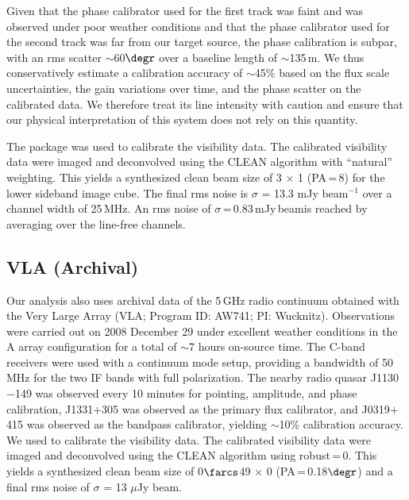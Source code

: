 \documentclass[]{emulateapj}
\begin{document}
%
%
Given that the phase calibrator used for the first track was faint and was
observed under poor weather conditions and that the phase calibrator used for
the second track was far from our target source, the phase calibration is
subpar, with an rms scatter $\sim$60$\degr$ over a baseline length of $\sim$135\,m.
We thus conservatively estimate
a calibration accuracy of $\sim$45\% based on the flux scale uncertainties,
the gain variations over time, and the phase scatter on the calibrated data. We
therefore treat its line intensity with caution and ensure that our physical interpretation
of this system does not rely on this quantity.

The  package was used to calibrate the visibility data.
The calibrated visibility data were
imaged and deconvolved using the CLEAN algorithm with ``natural'' weighting. This yields a synthesized clean
beam size of 3 $\times$ 1 (PA\,=\,8\degr) for the lower sideband
image cube. The final rms noise is $\sigma$ = 13.3 mJy beam$^{-1}$
over a channel width of 25\,MHz. An rms noise of
$\sigma$\,=\,0.83\,mJy\,beam\pmOne is reached by averaging over the
line-free channels.

\subsection{VLA (Archival)} %
Our analysis also uses archival data of the 5\,GHz
radio continuum obtained with the
Very Large Array (VLA; Program ID: AW741; PI: Wucknitz).
Observations were carried out on 2008 December 29 under excellent weather
conditions in the A array configuration for a total of $\sim$7 hours on-source time. The C-band receivers were used with a continuum mode setup,
providing a bandwidth of 50 MHz for the two IF bands with full polarization.
The nearby radio quasar J1130$-$149 was observed every 10 minutes for
pointing, amplitude, and phase calibration, J1331$+$305 was observed as the
primary flux calibrator, and J0319$+$415 was observed as the bandpass
calibrator, yielding $\sim$10\% calibration accuracy.
We used  to calibrate the visibility data.
The calibrated visibility data were imaged and deconvolved using
the CLEAN algorithm using robust\,=\,0. This yields a synthesized clean
beam size of 0$\farcs$49 $\times$ 0 (PA\,=\,0.18$\degr$) and a final
rms noise of $\sigma$ = 13 $\mu$Jy beam\pmOne.
\end{document}

